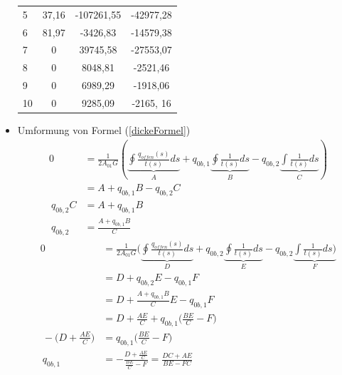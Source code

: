 \begin{itemize}
\begin{center}
\begin{tabular}[h]{l|c|c|c}
	5&37,16&-107261,55&-42977,28\\
	6&81,97&-3426,83&-14579,38\\
	7&0&39745,58&-27553,07\\
	8&0&8048,81&-2521,46\\
	9&0&6989,29&-1918,06\\
	10&0&9285,09&-2165, 16\\
\end{tabular}
\end{center}
	\item Umformung von Formel (\ref{dickeFormel})
	\begin{equation}
		\begin{split}
			0 &= \frac{1}{2A_{01}G}(\underbrace{\oint\frac{q_{offen}(s)}{t(s)}ds}_A+q_{0b,1}\underbrace{\oint\frac{1}{t(s)}ds}_B-q_{0b,2}\underbrace{\int\frac{1}{t(s)}ds}_C)\\\
			&=A+q_{0b,1}B-q_{0b,2}C\\\
		q_{0b,2}C&=A+q_{0b,1}B\\\
		q_{0b,2}&=\frac{A+q_{0b,1}B}{C}
		\end{split}
	\end{equation}
	\begin{equation}
		\begin{split}
			0 &= \frac{1}{2A_{01}G}(\underbrace{\oint\frac{q_{offen}(s)}{t(s)}ds}_D+q_{0b,2}\underbrace{\oint\frac{1}{t(s)}ds}_E-q_{0b,2}\underbrace{\int\frac{1}{t(s)}ds)}_F\\\
			&=D+q_{0b,2}E-q_{0b,1}F\\\
			&=D+\frac{A+q_{0b,1}B}{C}E-q_{0b,1}F\\\
			&=D+\frac{AE}{C}+q_{0b,1}\bigg(\frac{BE}{C}-F\bigg)\\\
			-\bigg(D+\frac{AE}{C}\bigg)&=q_{0b,1}\bigg(\frac{BE}{C}-F\bigg)\\\
			q_{0b,1}&=-\frac{D+\frac{AE}{C}}{\frac{BE}{C}-F}=\frac{DC+AE}{BE-FC}
		\end{split}
	\end{equation}
\end{itemize}
\newpage
